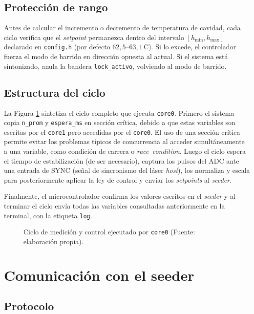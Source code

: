 \subsection{Protección de rango}

Antes de calcular el incremento o decremento de temperatura de cavidad, cada ciclo verifica que el \emph{setpoint} permanezca dentro del intervalo $[h_{\min}, h_{\max}]$ declarado en \texttt{config.h} (por defecto $62{,}5$--$63{,}1$\,\textdegree C). Si lo excede, el controlador fuerza el modo de barrido en dirección opuesta al actual. Si el sistema está sintonizado, anula la bandera \texttt{lock\_activo}, volviendo al modo de barrido.

\subsection{Estructura del ciclo}

La Figura \ref{fig:fw-ciclo} sintetiza el ciclo completo que ejecuta \texttt{core0}. Primero el sistema copia \texttt{n\_prom} y \texttt{espera\_ms} en sección crítica, debido a que estas variables son escritas por el \texttt{core1} pero accedidas por el \texttt{core0}. El uso de una sección crítica \cite{rpisdk} permite evitar los problemas típicos de concurrencia al acceder simultáneamente a una variable, como condición de carrera o \textit{race\ condition}. Luego el ciclo espera el tiempo de estabilización (de ser necesario), captura los pulsos del ADC ante una entrada de SYNC (señal de sincronismo del láser \emph{host}), los normaliza y escala para posteriormente aplicar la ley de control y enviar los \emph{setpoints} al \emph{seeder}.

Finalmente, el microcontrolador confirma los valores escritos en el \emph{seeder} y al terminar el ciclo envía todas las variables consultadas anteriormente en la terminal, con la etiqueta \texttt{log}.

\begin{figure}[htpb]
\centering
\resizebox{!}{0.85\textheight}{}
\caption{Ciclo de medición y control ejecutado por \texttt{core0} (Fuente: elaboración propia).}
\label{fig:fw-ciclo}
\end{figure}

\section{Comunicación con el seeder}
\label{sec:fw-seeder}

\subsection{Protocolo}

